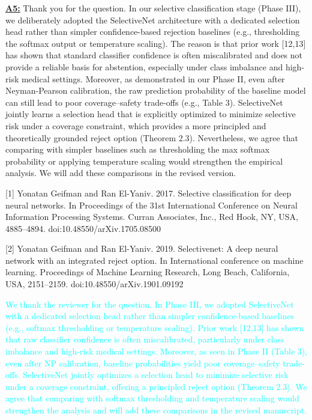 \documentclass[UTF8,12pt]{article}
\begin{document}
\underline{{\bf A5:}} Thank you for the question. In our selective classification stage (Phase III), we deliberately adopted the SelectiveNet architecture with a dedicated selection head rather than simpler confidence-based rejection baselines (e.g., thresholding the softmax output or temperature scaling). The reason is that prior work [12,13] has shown that standard classifier confidence is often miscalibrated and does not provide a reliable basis for abstention, especially under class imbalance and high-risk medical settings. Moreover, as demonstrated in our Phase II, even after Neyman-Pearson calibration, the raw prediction probability of the baseline model can still lead to poor coverage–safety trade-offs (e.g., Table 3). SelectiveNet jointly learns a selection head that is explicitly optimized to minimize selective risk under a coverage constraint, which provides a more principled and theoretically grounded reject option (Theorem 2.3). Nevertheless, we agree that comparing with simpler baselines such as thresholding the max softmax probability or applying temperature scaling would strengthen the empirical analysis. We will add these comparisons in the revised version.

[1] Yonatan Geifman and Ran El-Yaniv. 2017. Selective classification for deep neural networks. In Proceedings of the 31st International Conference on Neural Information Processing Systems. Curran Associates, Inc., Red Hook, NY, USA, 4885–4894. doi:10.48550/arXiv.1705.08500

[2] Yonatan Geifman and Ran El-Yaniv. 2019. Selectivenet: A deep neural network with an integrated reject option. In International conference on machine learning. Proceedings of Machine Learning Research, Long Beach, California, USA, 2151–2159. doi:10.48550/arXiv.1901.09192

\textcolor{cyan}{We thank the reviewer for the question. In Phase III, we adopted SelectiveNet with a dedicated selection head rather than simpler confidence-based baselines (e.g., softmax thresholding or temperature scaling). Prior work [12,13] has shown that raw classifier confidence is often miscalibrated, particularly under class imbalance and high-risk medical settings. Moreover, as seen in Phase II (Table 3), even after NP calibration, baseline probabilities yield poor coverage–safety trade-offs. SelectiveNet jointly optimizes a selection head to minimize selective risk under a coverage constraint, offering a principled reject option (Theorem 2.3). We agree that comparing with softmax thresholding and temperature scaling would strengthen the analysis and will add these comparisons in the revised manuscript.}
\end{document}
